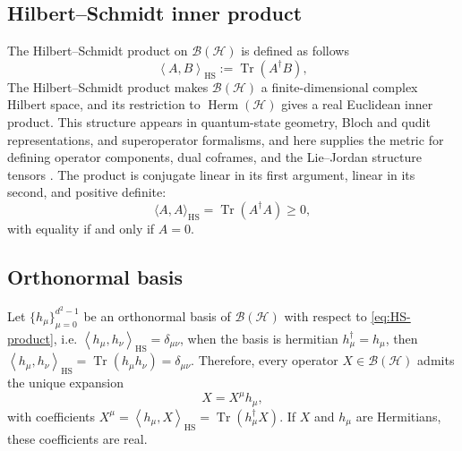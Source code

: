 \documentclass[notitlepage,aip,reprint,onecolumn]{revtex4-1}
\theoremstyle{definition}
\newcommand{\HH}{\mathcal H}
\newcommand{\BH}{\mathcal B(\HH)}
\newcommand{\HS}{\mathrm{HS}}
\renewcommand{\Tr}{\operatorname{Tr}}
\newcommand{\braketHS}[2]{\left\langle #1,#2\right\rangle_{\HS}}
\begin{document}
\subsection{Hilbert--Schmidt inner product}\label{SubSec:Inner product of Hilbert-Schmidt}
The Hilbert–Schmidt product on \(\BH\) is defined as follows
\begin{equation} \label{eq:HS-product}
     \braketHS{A}{B}:=\Tr(A^\dagger B),
\end{equation}
The Hilbert–Schmidt product makes \(\mathcal B(\mathcal H)\) a finite-dimensional complex Hilbert space, and its restriction to \(\operatorname{Herm}(\mathcal H)\) gives a real Euclidean inner product. This structure appears in quantum-state geometry, Bloch and qudit representations, and superoperator formalisms, and here supplies the metric for defining operator components, dual coframes, and the Lie–Jordan structure tensors \cite{Grabowski:2005my,BengtssonZyczkowski2017,Nambu:2005amn}. The product is conjugate linear in its first argument, linear in its second, and positive definite:
\[
    \langle A,A\rangle_{\mathrm{HS}}
    =
    \operatorname{Tr}(A^\dagger A)
    \geq 0,
\]
with equality if and only if \(A=0\).
\subsection{Orthonormal basis}\label{SubSec:Orthonormal basis}
Let $\{h_\mu\}_{\mu=0}^{d^2-1}$ be an orthonormal basis of $\BH$ with respect to \eqref{eq:HS-product}, i.e. \(\braketHS{h_\mu}{h_\nu}=\delta_{\mu\nu}\), when the basis is hermitian $h_\mu^\dagger=h_\mu$, then \( \braketHS{h_\mu}{h_\nu}=\Tr(h_\mu h_\nu)=\delta_{\mu\nu}\). Therefore, every operator $X\in\BH$ admits the unique expansion
\begin{equation} \label{eq:operator-expansion}
     X=X^\mu h_\mu,
\end{equation}
with coefficients \( X^\mu=\braketHS{h_\mu}{X}=\Tr(h_\mu^\dagger X)\). If $X$ and $h_\mu$ are Hermitians, these coefficients are real.
\end{document}
